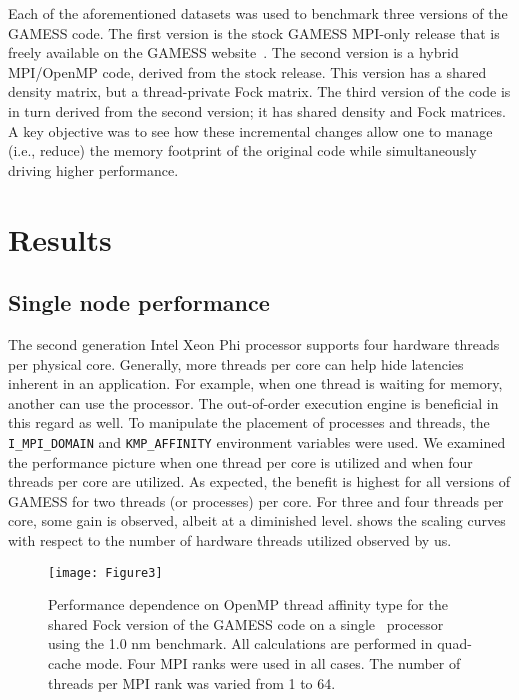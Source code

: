 Each of the aforementioned datasets was used to benchmark three versions of the GAMESS code. The first version is the stock GAMESS MPI-only release that is freely available on the GAMESS website~\cite{gamesswebsite}. The second version is a hybrid MPI/OpenMP code, derived from the stock release. This version has a shared density matrix, but a thread-private Fock matrix. The third version of the code is in turn derived from the second version; it has shared density and Fock matrices. A key objective was to see how these incremental changes allow one to manage (i.e., reduce) the memory footprint of the original code while simultaneously driving higher performance.

\section{Results}
\label{sec:results}

\subsection{Single node performance}
\label{ssec:singlenode}
The second generation Intel Xeon Phi processor supports four hardware threads per physical core. Generally, more threads per core can help hide latencies inherent in an application. For example, when one thread is waiting for memory, another can use the processor. The out-of-order execution engine is beneficial in this regard as well. To manipulate the placement of processes and threads, the \verb|I_MPI_DOMAIN| and \verb|KMP_AFFINITY| environment variables were used. 
We examined the performance picture when one thread per core is utilized and when four threads per core are utilized. As expected, the benefit is highest for all versions of GAMESS for two threads (or processes) per core. For three and four threads per core, some gain is observed, albeit at a diminished level.  shows the scaling curves with respect to the number of hardware threads utilized observed by us.

\begin{figure}
	\texttt{[image: Figure3]}
	\caption{Performance dependence on OpenMP thread affinity type for the shared Fock version of the GAMESS code
    		 on a single \intelphireg\ processor using the 1.0 nm benchmark.
             All calculations are performed in quad-cache mode.
             Four MPI ranks were used in all cases.
             The number of threads per MPI rank was varied from 1 to 64.}
    \label{fig:afty}
\end{figure}

